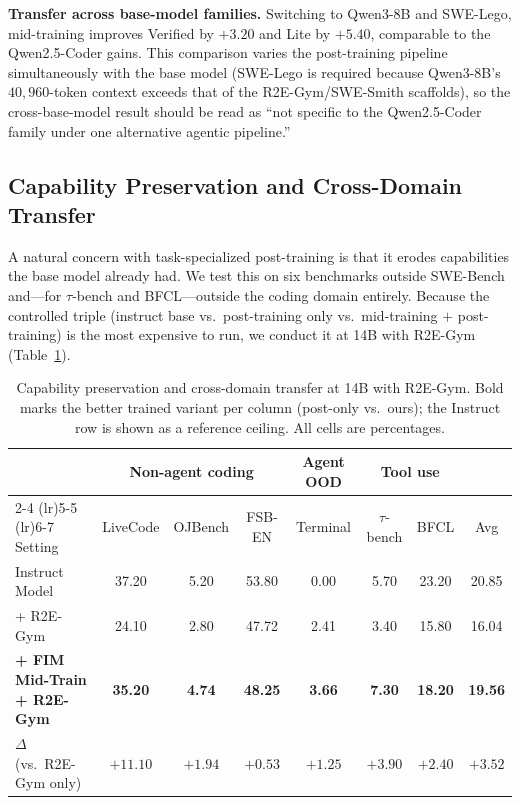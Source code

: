 \textbf{Transfer across base-model families.}
Switching to Qwen3-8B and SWE-Lego, mid-training improves Verified by
$+3.20$ and Lite by $+5.40$, comparable to the Qwen2.5-Coder gains. This
comparison varies the post-training pipeline simultaneously with the
base model (SWE-Lego is required because Qwen3-8B's $40{,}960$-token
context exceeds that of the R2E-Gym/SWE-Smith scaffolds), so the
cross-base-model result should be read as ``not specific to the
Qwen2.5-Coder family under one alternative agentic pipeline.''

\vspace{-0.5ex}
\subsection{Capability Preservation and Cross-Domain Transfer}
\label{sec:exp:gen}

A natural concern with task-specialized post-training is that it erodes
capabilities the base model already had. We test this on six benchmarks
outside SWE-Bench and---for $\tau$-bench and BFCL---outside the coding
domain entirely. Because the controlled triple (instruct base vs.\
post-training only vs.\ mid-training $+$ post-training) is the most
expensive to run, we conduct it at 14B with R2E-Gym
(Table~\ref{tab:cap}).

\begin{table}[t]
\centering
\caption{Capability preservation and cross-domain transfer at 14B with
R2E-Gym. Bold marks the better trained variant per column (post-only
vs.\ ours); the Instruct row is shown as a reference ceiling. All cells
are percentages.}
\label{tab:cap}
\small
\setlength{\tabcolsep}{4pt}
\begin{tabular}{lcccccc|c}
\toprule
& \multicolumn{3}{c}{Non-agent coding}
& \multicolumn{1}{c}{Agent OOD}
& \multicolumn{2}{c}{Tool use}
& \\
\cmidrule(lr){2-4} \cmidrule(lr){5-5} \cmidrule(lr){6-7}
Setting
& LiveCode & OJBench & FSB-EN
& Terminal
& $\tau$-bench & BFCL
& Avg \\
\midrule
Instruct Model
  & 37.20 & 5.20 & 53.80
  & 0.00
  & 5.70 & 23.20
  & 20.85 \\
+ R2E-Gym
  & 24.10 & 2.80 & 47.72
  & 2.41
  & 3.40 & 15.80
  & 16.04 \\
\textbf{+ FIM Mid-Train + R2E-Gym}
  & \textbf{35.20} & \textbf{4.74} & \textbf{48.25}
  & \textbf{3.66}
  & \textbf{7.30} & \textbf{18.20}
  & \textbf{19.56} \\
\rowcolor{blue!8}
$\Delta$ (vs.\ R2E-Gym only)
  & $+11.10$ & $+1.94$ & $+0.53$
  & $+1.25$
  & $+3.90$ & $+2.40$
  & $+3.52$ \\
\bottomrule
\end{tabular}
\end{table}

